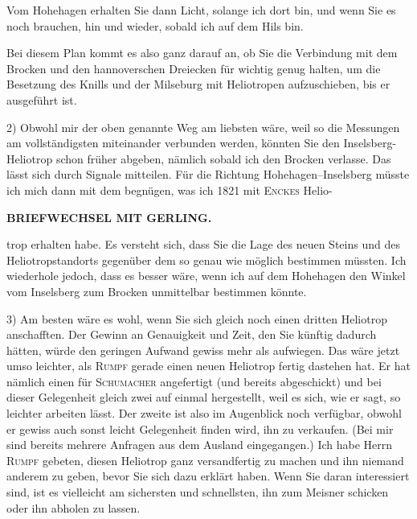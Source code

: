 Vom Hohehagen erhalten Sie dann  Licht, solange ich dort bin, und wenn Sie es noch brauchen, hin und wieder, sobald ich auf dem Hils bin.
\par\noindent\hspace*{\parindent}Bei diesem Plan kommt es also ganz darauf an, ob Sie die Verbindung mit dem Brocken und den hannoverschen Dreiecken für wichtig genug halten, um die Besetzung des Knills und der Milseburg mit Heliotropen aufzuschieben, bis er ausgeführt ist.
\par\noindent\hspace*{\parindent}2) Obwohl mir der oben genannte Weg am liebsten wäre, weil so die Messungen am vollständigsten miteinander verbunden werden, könnten Sie den Inselsberg-Heliotrop  schon früher abgeben, nämlich sobald ich den Brocken verlasse. Das lässt sich durch Signale mitteilen.
Für die Richtung Hohehagen–Inselsberg müsste ich mich dann mit dem begnügen, was ich 1821 mit \textsc{Enckes} Helio-
\par\clearpage
\noindent{}\hfill{\small\textbf{BRIEFWECHSEL MIT GERLING.}}\hfill\null\par\medskip
\noindent trop erhalten habe.
Es versteht sich, dass Sie die Lage des neuen Steins und des Heliotropstandorts gegenüber dem  so genau wie möglich bestimmen müssten.
Ich wiederhole jedoch, dass es besser wäre, wenn ich auf dem Hohehagen den Winkel vom Inselsberg zum Brocken unmittelbar bestimmen könnte.
\par\noindent\hspace*{\parindent}3) Am besten wäre es wohl, wenn Sie sich gleich noch einen dritten Heliotrop anschafften.
Der Gewinn an Genauigkeit und Zeit, den Sie künftig dadurch hätten, würde den geringen Aufwand gewiss mehr als aufwiegen.
Das wäre jetzt umso leichter, als \textsc{Rumpf} gerade einen neuen Heliotrop fertig dastehen hat.
Er hat nämlich einen für \textsc{Schumacher} angefertigt (und bereits abgeschickt) und bei dieser Gelegenheit gleich zwei auf einmal hergestellt, weil es sich, wie er sagt, so leichter arbeiten lässt.
Der zweite ist also im Augenblick noch verfügbar, obwohl er gewiss auch sonst leicht Gelegenheit finden wird, ihn zu verkaufen.
(Bei mir sind bereits mehrere Anfragen aus dem Ausland eingegangen.)
Ich habe Herrn \textsc{Rumpf} gebeten, diesen Heliotrop ganz versandfertig zu machen und ihn niemand anderem zu geben, bevor Sie sich dazu erklärt haben.
Wenn Sie daran interessiert sind, ist es vielleicht am sichersten und schnellsten, ihn zum Meisner schicken oder ihn abholen zu lassen.
